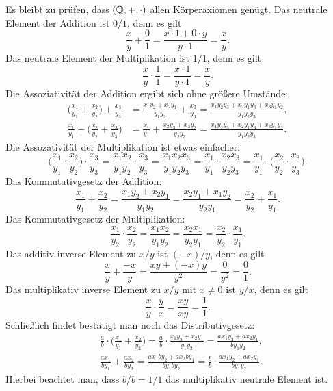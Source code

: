 Es bleibt zu prüfen, dass $(\mathbb Q,+,\cdot)$ allen Körperaxiomen genügt.
Das neutrale Element der Addition ist $0/1$, denn es gilt
\[\frac{x}{y}+\frac{0}{1} = \frac{x\cdot 1+0\cdot y}{y\cdot 1} = \frac{x}{y}.\]
Das neutrale Element der Multiplikation ist $1/1$, denn es gilt
\[\frac{x}{y}\cdot\frac{1}{1} = \frac{x\cdot 1}{y\cdot 1} = \frac{x}{y}.\]
Die Assoziativität der Addition ergibt sich ohne größere Umstände:
\begin{align*}
\bigg(\frac{x_1}{y_1}+\frac{x_2}{y_2}\bigg)+\frac{x_3}{y_3}
&= \frac{x_1y_2+x_2y_1}{y_1y_2} + \frac{x_3}{y_3}
= \frac{x_1y_2y_3+x_2y_1y_3+x_3y_1y_2}{y_1y_2y_3},\\
\frac{x_1}{y_1}+\bigg(\frac{x_2}{y_2}+\frac{x_3}{y_3}\bigg)
&= \frac{x_1}{y_1}+\frac{x_2y_3+x_3y_2}{y_2y_3}
= \frac{x_1y_2y_3+x_2y_1y_3+x_3y_1y_2}{y_1y_2y_3}.
\end{align*}
Die Assozativität der Multiplikation ist etwas einfacher:
\[\bigg(\frac{x_1}{y_1}\cdot\frac{x_2}{y_2}\bigg)\cdot\frac{x_3}{y_3}
= \frac{x_1x_2}{y_1y_2}\cdot\frac{x_3}{y_3} = \frac{x_1x_2x_3}{y_1y_2y_3}
= \frac{x_1}{y_1}\cdot\frac{x_2x_3}{y_2y_3}
= \frac{x_1}{y_1}\cdot\bigg(\frac{x_2}{y_2}\cdot\frac{x_3}{y_3}\bigg).\]
Das Kommutativgesetz der Addition:
\[\frac{x_1}{y_1}+\frac{x_2}{y_2} = \frac{x_1y_2+x_2y_1}{y_1y_2}
= \frac{x_2y_1+x_1y_2}{y_2y_1}
= \frac{x_2}{y_2}+\frac{x_1}{y_1}.\]
Das Kommutativgesetz der Multiplikation:
\[\frac{x_1}{y_2}\cdot\frac{x_2}{y_2}
= \frac{x_1x_2}{y_1y_2} = \frac{x_2x_1}{y_2y_1}
= \frac{x_2}{y_2}\cdot\frac{x_1}{y_1}.\]
Das additiv inverse Element zu $x/y$ ist $(-x)/y$, denn es gilt
\[\frac{x}{y}+\frac{-x}{y} = \frac{xy+(-x)y}{y^2}
= \frac{0}{y^2} = \frac{0}{1}.\]
Das multiplikativ inverse Element zu $x/y$ mit $x\ne 0$
ist $y/x$, denn es gilt
\[\frac{x}{y}\cdot\frac{y}{x} = \frac{xy}{xy} = \frac{1}{1}.\]
Schließlich findet bestätigt man noch das Distributivgesetz:
\begin{align*}
&\frac{a}{b}\cdot\bigg(\frac{x_1}{y_1}+\frac{x_2}{y_2}\bigg)
= \frac{a}{b}\cdot\frac{x_1y_2+x_2y_1}{y_1y_2}
= \frac{ax_1y_2+ax_2y_1}{by_1y_2},\\
&\frac{ax_1}{by_1}+\frac{ax_2}{by_2}
= \frac{ax_1by_2+ax_2by_1}{by_1by_2}
= \frac{b}{b}\cdot\frac{ax_1y_2+ax_2y_1}{by_1y_2}.
\end{align*}
Hierbei beachtet man, dass $b/b=1/1$ das multiplikativ
neutrale Element ist.\;\qedsymbol

